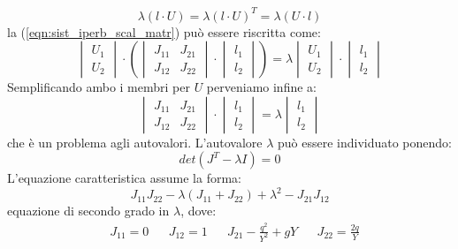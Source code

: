 \documentclass[12pt]{article} %
\begin{document}
\begin{equation}
    \lambda \left(l \cdot U\right)=\lambda \left(l \cdot U \right)^T=\lambda \left(U \cdot l \right)
\end{equation}
\noindent la (\ref{eqn:sist_iperb_scal_matr}) può essere riscritta come:
\begin{equation}
    \begin{vmatrix}U_1 \\ U_2\end{vmatrix}\cdot\left(
    \begin{vmatrix}J_{11}&J_{21}\\J_{12}&J_{22}\end{vmatrix}\cdot\begin{vmatrix}l_1\\l_2\end{vmatrix}\right) =\lambda\begin{vmatrix}U_1 \\ U_2\end{vmatrix}\cdot\begin{vmatrix}l_1\\l_2\end{vmatrix}
\end{equation}
\noindent Semplificando ambo i membri per $U$ perveniamo infine a:
\begin{equation}
    \begin{vmatrix}J_{11}&J_{21}\\J_{12}&J_{22}\end{vmatrix}\cdot\begin{vmatrix}l_1\\l_2\end{vmatrix} =\lambda\begin{vmatrix}l_1 \\ l_2\end{vmatrix}
    \label{eqn:problema_autovalori}
\end{equation}
\noindent che è un problema agli autovalori. L'autovalore $\lambda$ può essere individuato ponendo:
\begin{equation}
    det\left(J^T-\lambda I\right) = 0
    \label{eqn:determinante_uguale_zero}
\end{equation}
\noindent L'equazione caratteristica assume la forma:
\begin{equation}
    J_{11}J_{22}-\lambda(J_{11}+J_{22})+\lambda^2-J_{21}J_{12}
\end{equation}
\noindent equazione di secondo grado in $\lambda$, dove:
\begin{align*}
    &J_{11}=0 & &J_{12}=1 & &J_{21}-\frac{q^2}{Y^2}+gY & &J_{22}=\frac{2q}{Y}
\end{align*}
\end{document}
